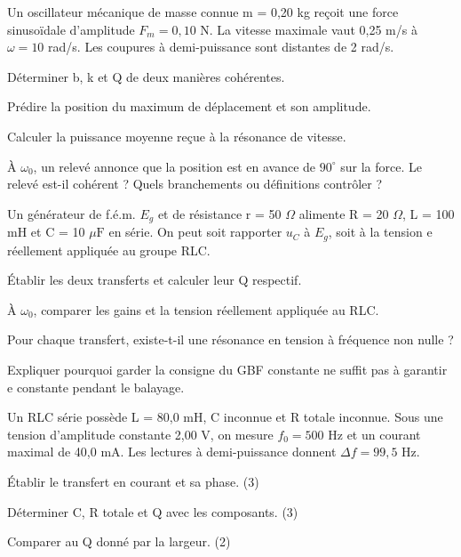 \label{ch06-ex-D2}
Un oscillateur mécanique de masse connue m = 0,20 kg reçoit une force sinusoïdale d’amplitude $F_m=0{,}10$ N. La vitesse maximale vaut 0,25 m/s à $\omega=10$ rad/s. Les coupures à demi-puissance sont distantes de 2 rad/s.\begin{questions}
\item Déterminer b, k et Q de deux manières cohérentes.
\item Prédire la position du maximum de déplacement et son amplitude.
\item Calculer la puissance moyenne reçue à la résonance de vitesse.
\item À $\omega_0$, un relevé annonce que la position est en avance de $90^\circ$ sur la force. Le relevé est-il cohérent ? Quels branchements ou définitions contrôler ?
\end{questions}


\label{ch06-ex-D3}
Un générateur de f.é.m. $E_g$ et de résistance r = 50 $\Omega$ alimente R = 20 $\Omega$, L = 100 mH et C = 10 $\mu\mathrm F$ en série. On peut soit rapporter $u_C$ à $E_g$, soit à la tension e réellement appliquée au groupe RLC.\begin{questions}
\item Établir les deux transferts et calculer leur Q respectif.
\item À $\omega_0$, comparer les gains et la tension réellement appliquée au RLC.
\item Pour chaque transfert, existe-t-il une résonance en tension à fréquence non nulle ?
\item Expliquer pourquoi garder la consigne du GBF constante ne suffit pas à garantir e constante pendant le balayage.
\end{questions}


Un RLC série possède L = 80,0 mH, C inconnue et R totale inconnue. Sous une tension d’amplitude constante 2,00 V, on mesure $f_0=500$ Hz et un courant maximal de 40,0 mA. Les lectures à demi-puissance donnent $\Delta f=99{,}5$ Hz.
\begin{questions}
\item Établir le transfert en courant et sa phase. (3)
\item Déterminer C, R totale et Q avec les composants. (3)
\item Comparer au Q donné par la largeur. (2)
\end{questions}

